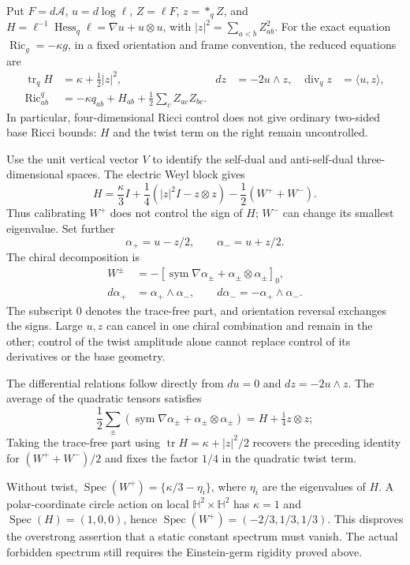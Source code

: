 \documentclass[a4paper,11pt]{article}
\numberwithin{equation}{section}
\theoremstyle{definition}
\newcommand{\Ric}{\operatorname{Ric}}
\newcommand{\tr}{\operatorname{tr}}
\begin{document}
Put $F=d\mathcal A$, $u=d\log\ell$, $Z=\ell F$, $z=*_{q}Z$, and $H=\ell^{-1}\operatorname{Hess}_q\ell=\nabla u+u\otimes u$, with $|z|^2=\sum_{a<b}Z_{ab}^2$. For the exact equation $\Ric_g=-\kappa g$, in a fixed orientation and frame convention, the reduced equations are
\begin{align*}
\tr_q H&=\kappa+\tfrac12|z|^2,
&dz&=-2u\wedge z,&\operatorname{div}_qz&=\langle u,z\rangle,\\
\Ric^q_{ab}&=-\kappa q_{ab}+H_{ab}
+\tfrac12\sum_cZ_{ac}Z_{bc}.
\end{align*}
In particular, four-dimensional Ricci control does not give ordinary two-sided base Ricci bounds: $H$ and the twist term on the right remain uncontrolled.

Use the unit vertical vector $V$ to identify the self-dual and anti-self-dual three-dimensional spaces. The electric Weyl block gives
\[
H=\frac{\kappa}{3}I+\frac14(|z|^2I-z\otimes z)
-\frac12(W^++W^-).
\]
Thus calibrating $W^+$ does not control the sign of $H$; $W^-$ can change its smallest eigenvalue. Set further
\[
\alpha_+=u-z/2,\qquad \alpha_-=u+z/2.
\]
The chiral decomposition is
\begin{align*}
W^\pm&=-[\operatorname{sym}\nabla\alpha_\pm+
\alpha_\pm\otimes\alpha_\pm]_0,\\
d\alpha_+&=\alpha_+\wedge\alpha_-,\qquad
d\alpha_-=-\alpha_+\wedge\alpha_-.
\end{align*}
The subscript $0$ denotes the trace-free part, and orientation reversal exchanges the signs. Large $u,z$ can cancel in one chiral combination and remain in the other; control of the twist amplitude alone cannot replace control of its derivatives or the base geometry.

The differential relations follow directly from $du=0$ and $dz=-2u\wedge z$. The average of the quadratic tensors satisfies
\[
\frac12\sum_{\pm}
(\operatorname{sym}\nabla\alpha_\pm+\alpha_\pm\otimes\alpha_\pm)
=H+\tfrac14z\otimes z;
\]
Taking the trace-free part using $\tr H=\kappa+|z|^2/2$ recovers the preceding identity for $(W^++W^-)/2$ and fixes the factor $1/4$ in the quadratic twist term.

Without twist, $\operatorname{Spec}(W^+)=\{\kappa/3-\eta_i\}$, where $\eta_i$ are the eigenvalues of $H$. A polar-coordinate circle action on local $\mathbb H^2\times\mathbb H^2$ has $\kappa=1$ and $\operatorname{Spec}(H)=(1,0,0)$, hence $\operatorname{Spec}(W^+)=(-2/3,1/3,1/3)$. This disproves the overstrong assertion that a static constant spectrum must vanish. The actual forbidden spectrum still requires the Einstein-germ rigidity proved above.
\end{document}
